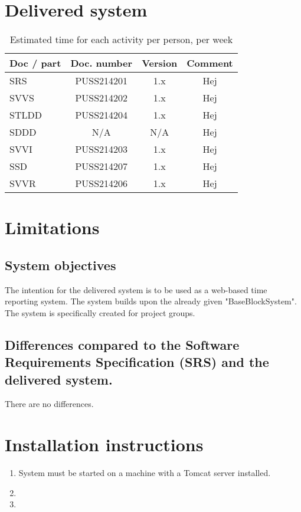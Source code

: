\documentclass{article}
\begin{document}
\section{Delivered system}
 \begin{table}[h]
            \centering
            
             \caption{Estimated time for each activity per person, per week}
            \begin{tabular}{|l|c|c|c|}
                \hline
                    \textbf{Doc / part} & \textbf{Doc.  number} & \textbf{Version} & \textbf{Comment} \\
                \hline
                    SRS & PUSS214201 & 1.x & Hej \\
                 \hline
                    SVVS & PUSS214202 & 1.x & Hej\\
                 \hline
                    STLDD & PUSS214204 & 1.x & Hej\\
                 \hline
                    SDDD & N/A  & N/A & Hej\\
                 \hline
                    SVVI & PUSS214203 & 1.x & Hej\\
                 \hline
                    SSD & PUSS214207 & 1.x & Hej\\
                 \hline
                    SVVR & PUSS214206 & 1.x & Hej\\
                 \hline
                 
            \end{tabular}
           
            \label{activitytable}
        \end{table}

\section{Limitations}


\subsection{System objectives}
The intention for the delivered system is to be used as a web-based time reporting system. The system builds upon the already given "BaseBlockSystem". The system is specifically created for project groups.

\subsection{Differences  compared  to  the  Software  Requirements Specification (SRS) and the delivered system.}
There are no differences.

\section{Installation instructions}
\begin{enumerate}
    \item System must be started on a machine with a Tomcat server installed.
    \item 
    
    \item
\end{enumerate}

\end{document}

